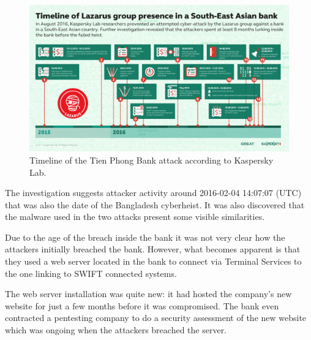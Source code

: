\documentclass[12pt]{article}
\begin{document}
        \begin{figure}[H]
        \centering
        \includegraphics[width=\textwidth,cfbox=red 0.1mm 0.1mm]{figures/lazarus-timeline.png}
        \caption{Timeline of the Tien Phong Bank attack according to Kaspersky Lab.}
        \label{fig:lazarustimeline}
        \end{figure}
        
        The investigation suggests attacker activity around 2016-02-04 14:07:07 (UTC) that was also the date of the Bangladesh cyberheist. It was also discovered that the malware used in the two attacks present some visible similarities. 
        
        Due to the age of the breach inside the bank it was not very clear how the attackers initially breached the bank. However, what becomes apparent is that they used a web server located in the bank to connect via Terminal Services to the one linking to SWIFT connected systems.
        
        The web server installation was quite new: it had hosted the company's new website for just a few months before it was compromised. The bank even contracted a pentesting company to do a security assessment of the new website which was ongoing when the attackers breached the server.\cite{kasperskycontenthub}
\end{document}
